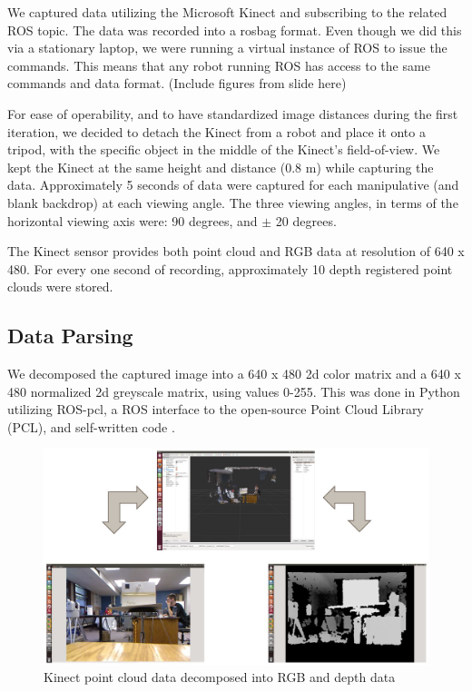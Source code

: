 \documentclass{article}
\begin{document}
We captured data utilizing the Microsoft Kinect and subscribing to the related ROS topic.  The data was recorded into a rosbag format.  Even though we did this via a stationary laptop, we were running a virtual instance of ROS to issue the commands. This means that any robot running ROS has access to the same commands and data format. (Include figures from slide here)

For ease of operability, and to have standardized image distances during the first iteration, we decided to detach the Kinect from a robot and place it onto a tripod, with the specific object in the middle of the Kinect's field-of-view. We kept the Kinect at the same height and distance (0.8 m) while capturing the data. Approximately 5 seconds of data were captured for each manipulative (and blank backdrop) at each viewing angle. The three viewing angles, in terms of the horizontal viewing axis were: 90 degrees, and \(\pm\) 20 degrees.

The Kinect sensor provides both point cloud and RGB data at resolution of 640 x 480. For every one second of recording, approximately 10 depth registered point clouds were stored.

\subsection{Data Parsing}
We decomposed the captured image into a 640 x 480 2d color matrix and a 640 x 480 normalized 2d greyscale matrix, using values 0-255. This was done in Python utilizing ROS-pcl, a ROS interface to the open-source Point Cloud Library (PCL), and self-written code \cite{pcl, rospcl}.

\begin{figure}
	\centering
	\includegraphics[width=1.0\textwidth]{RVIZ_Decomposition.jpg}
	\caption{Kinect point cloud data decomposed into RGB and depth data}
	\label{fig:RVIZ_decomp}
\end{figure}
\end{document}
